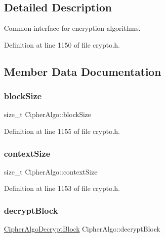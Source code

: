 \subsection{Detailed Description}
Common interface for encryption algorithms. 

Definition at line 1150 of file crypto.\+h.



\subsection{Member Data Documentation}
\mbox{\label{structCipherAlgo_a1f318963e641736f3c5836274ef758f1}} 
\subsubsection{\texorpdfstring{block\+Size}{blockSize}}
{\footnotesize\ttfamily size\+\_\+t Cipher\+Algo\+::block\+Size}



Definition at line 1155 of file crypto.\+h.

\mbox{\label{structCipherAlgo_a79c74860795d2bf2ef6bff7885a33666}} 
\subsubsection{\texorpdfstring{context\+Size}{contextSize}}
{\footnotesize\ttfamily size\+\_\+t Cipher\+Algo\+::context\+Size}



Definition at line 1153 of file crypto.\+h.

\mbox{\label{structCipherAlgo_a3023886b85aca88688456ed460a8576d}} 
\subsubsection{\texorpdfstring{decrypt\+Block}{decryptBlock}}
{\footnotesize\ttfamily \hyperlink{cyclone__crypto_2core_2crypto_8h_a15510227bd1c7721d1e3af2480069990}{Cipher\+Algo\+Decrypt\+Block} Cipher\+Algo\+::decrypt\+Block}



